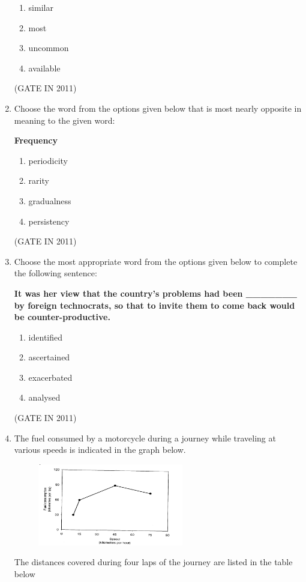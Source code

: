 \documentclass[journal]{IEEEtran}
\begin{document}
\begin{enumerate}
\begin{enumerate}
\item similar
\item most
\item uncommon
\item available
\end{enumerate}
\hfill(GATE IN 2011)

\item Choose the word from the options given below that is most nearly opposite in meaning to the given word:

\textbf{Frequency}


\begin{enumerate}
\item periodicity
\item rarity
\item gradualness
\item persistency
\end{enumerate}
\hfill(GATE IN 2011)

\item Choose the most appropriate word from the options given below to complete the following sentence:

\textbf{It was her view that the country's problems had been \_\_\_\_\_\_\_ by foreign technocrats, so that to invite them to come back would be counter-productive.}


\begin{enumerate}
\item identified
\item ascertained
\item exacerbated
\item analysed
\end{enumerate}
 \hfill(GATE IN 2011)

\item The fuel consumed by a motorcycle during a journey while traveling at various speeds is indicated in the graph below.
\begin{figure}[H]
    \centering
      \includegraphics[width=0.6\textwidth]{20.png} 
      \caption{}
    \label{fig:fig20} 
\end{figure}
The distances covered during four laps of the journey are listed in the table below



\end{enumerate}
\end{document}
